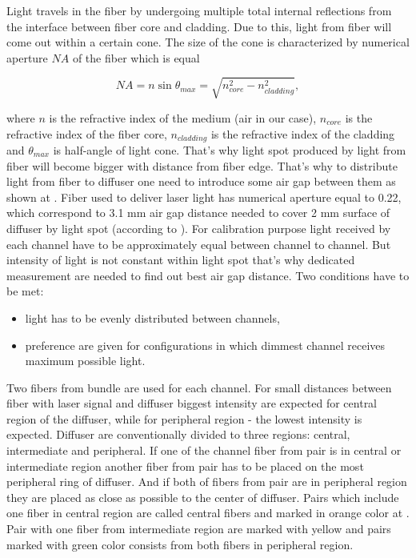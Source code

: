 Light travels in the fiber by undergoing multiple total internal reflections from the interface between fiber core and cladding. 
Due to this, light from fiber will come out within a certain cone. The size of the cone is characterized by numerical aperture $NA$ of the fiber which is equal

\begin{equation}
\label{eq:numericalApperture}
 NA = n \sin{\theta_{max}} = \sqrt{n_{core}^2 - n_{cladding}^2},
\end{equation}

where $n$ is the refractive index of the medium (air in our case), $n_{core}$ is the refractive index of the fiber core, $n_{cladding}$ is the refractive index 
of the cladding and $\theta_{max}$ is half-angle of light cone. That's why light spot produced by light from fiber will become bigger with distance from fiber 
edge. 
That's why to distribute light from fiber to diffuser one need to introduce some air gap between them as shown at .
Fiber used to deliver laser light has numerical aperture equal to 0.22, which correspond to 3.1 mm air gap distance needed to cover 2 mm surface of diffuser by 
light spot (according to ).
For calibration purpose light received by each channel have to be approximately equal between channel to channel. But intensity of light is not constant within 
light spot that's why dedicated measurement are needed to find out best air gap distance.
Two conditions have to be met:
\begin{itemize}
 \item light has to be evenly distributed between channels,
 \item preference are given for configurations in which dimmest channel receives maximum possible light.
\end{itemize}
Two fibers from bundle are used for each channel. For small distances between fiber with laser signal and diffuser biggest intensity are expected for central 
region of the diffuser, while for peripheral region - the lowest intensity is expected. 
Diffuser are conventionally divided to three regions: central, intermediate and peripheral. 
If one of the channel fiber from pair is in central or intermediate region another fiber from pair has to be placed on the most peripheral ring of diffuser.
And if both of fibers from pair are in peripheral region they are placed as close as possible to the center of diffuser.
Pairs which include one fiber in central region are called central fibers and marked in orange color at .
Pair with one fiber from intermediate region are marked with yellow and pairs marked with green color consists from both fibers in peripheral region.






